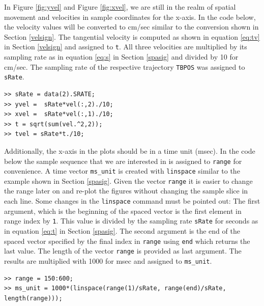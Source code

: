 \documentclass[a4paper, 12pt]{article}
\begin{document}
In Figure \ref{fig:yvel} and Figure \ref{fig:xvel}, we are still in the realm of spatial movement and velocities in sample coordinates for the x-axis. In the code below, the velocity values will be converted to cm/sec similar to the conversion shown in Section \ref{velsign}. The tangential velocity is computed as shown in equation \eqref{eq:tv} in Section \ref{velsign} and assigned to \texttt{t}. All three velocities are multiplied by its sampling rate as in equation \eqref{eq:s} in Section \ref{spasig} and divided by 10 for cm/sec. The sampling rate of the respective trajectory \texttt{TBPOS} was assigned to \texttt{sRate}. 

\begin{verbatim}
>> sRate = data(2).SRATE;
>> yvel =  sRate*vel(:,2)./10; 
>> xvel =  sRate*vel(:,1)./10;
>> t = sqrt(sum(vel.^2,2));
>> tvel = sRate*t./10; 
\end{verbatim}

Additionally, the x-axis in the plots should be in a time unit (msec). In the code below the sample sequence that we are interested in is assigned to \texttt{range} for convenience. A time vector \texttt{ms\_unit} is created with \texttt{linspace} similar to the example shown in Section \ref{spasig}. Given the vector \texttt{range} it is easier to change the range later on and re-plot the figures without changing the sample slice in each line. Some changes in the \texttt{linspace} command must be pointed out: The first argument, which is the beginning of the spaced vector is the first element in range index by \texttt{1}. This value is divided by the sampling rate \texttt{sRate} for seconds as in equation \eqref{eq:t} in Section \ref{spasig}. The second argument is the end of the spaced vector specified by the final index in \texttt{range} using \texttt{end} which returns the last value. The length of the vector \texttt{range} is provided as last argument. The results are multiplied with 1000 for msec and assigned to \texttt{ms\_unit}.

\begin{verbatim}
>> range = 150:600;
>> ms_unit = 1000*(linspace(range(1)/sRate, range(end)/sRate, length(range)));
\end{verbatim}
\end{document}
